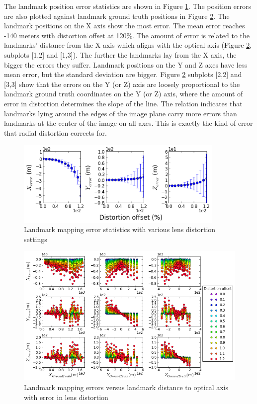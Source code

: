 The landmark position error statistics are shown in Figure
\ref{fig:simfig45}. The position errors are also plotted against
landmark ground truth positions in Figure \ref{fig:simfig46}. The
landmark positions on the X axis show the most error. The mean error
reaches -140 meters with distortion offset at 120\%. The amount of
error is related to the landmarks' distance from the X axis which aligns
with the optical axis (Figure \ref{fig:simfig46}, subplots [1,2] and
[1,3]). The further the landmarks lay from the X axis, the bigger the
errors they suffer. Landmark positions on the Y and Z axes have less
mean error, but the standard deviation are bigger. Figure
\ref{fig:simfig46} subplots [2,2] and [3,3] show that the errors on the
Y (or Z) axis are loosely proportional to the landmark ground truth
coordinates on the Y (or Z) axis, where the amount of error in distortion
determines the slope of the line. The relation indicates that
landmarks lying around the edges of the image plane carry more
errors than landmarks at the center of the image on all axes. This is
exactly the kind of error that radial distortion corrects for.

\begin{figure}[h]%
  \centering
  \includegraphics[width=10cm,keepaspectratio=true]{./Figures/SimulationFigures/Figure45.png}
  \caption{Landmark mapping error statistics with various lens
    distortion settings}
  \label{fig:simfig45}
\end{figure}

\begin{figure}[h] %
  \centering
  \includegraphics[width=13cm,keepaspectratio=true]{./Figures/SimulationFigures/Figure46.png}
  \caption{Landmark mapping errors versus landmark distance
    to optical axis with error in lens distortion}
  \label{fig:simfig46}
\end{figure}
\FloatBarrier

